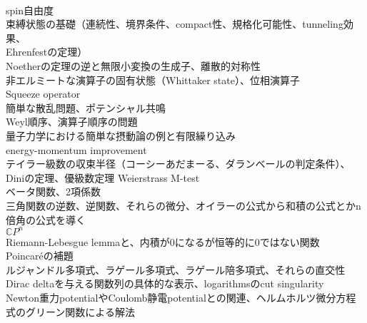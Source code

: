 \documentclass[dvipdfmx, uplatex]{jsarticle}
\begin{document}
\\spin自由度
\\束縛状態の基礎（連続性、境界条件、compact性、規格化可能性、tunneling効果、
\\Ehrenfestの定理）
\\Noetherの定理の逆と無限小変換の生成子、離散的対称性
\\非エルミートな演算子の固有状態（Whittaker state）、位相演算子
\\Squeeze operator
\\簡単な散乱問題、ポテンシャル共鳴
\\Weyl順序、演算子順序の問題
\\量子力学における簡単な摂動論の例と有限繰り込み
\\energy-momentum improvement
\\テイラー級数の収束半径（コーシーあだまーる、ダランベールの判定条件）、Diniの定理、優級数定理 Weierstrass M-test
\\ベータ関数、2項係数
\\三角関数の逆数、逆関数、それらの微分、オイラーの公式から和積の公式とかn倍角の公式を導く
\\$\mathbb{C}P^n$
\\Riemann-Lebesgue lemmaと、内積が0になるが恒等的に0ではない関数
\\Poincar\'eの補題
\\ルジャンドル多項式、ラゲール多項式、ラゲール陪多項式、それらの直交性
\\Dirac deltaを与える関数列の具体的な表示、logarithmsのcut singularity
\\Newton重力potentialやCoulomb静電potentialとの関連、ヘルムホルツ微分方程式のグリーン関数による解法

\newpage


\newpage


\newpage


\newpage


\newpage
{}
\end{document}
